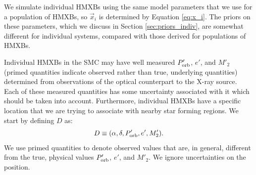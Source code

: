 \documentclass[usenatbib]{mnras}
\newcommand{\given}{\,|\,}
\begin{document}





We simulate individual HMXBs using the same model parameters that we use for a population of HMXBs, so $\vec{x}_i$ is determined by Equation \ref{eq:x_i}. The priors on these parameters, which we discuss in Section \ref{sec:priors_indiv}, are somewhat different for individual systems, compared with those derived for populations of HMXBs.

Individual HMXBs in the SMC may have well measured $P'_{\rm orb}$, $e'$, and $M'_2$ (primed quantities indicate observed rather than true, underlying quantities) determined from observations of the optical counterpart to the X-ray source. Each of these measured quantities has some uncertainty associated with it which should be taken into account. Furthermore, individual HMXBs have a specific location that we are trying to associate with nearby star forming regions. We start by defining $D$ as:
\begin{equation}
D \equiv (\alpha, \delta, P'_{\rm orb}, e', M'_2). \label{eq:D}
\end{equation}
We use primed quantities to denote observed values that are, in general, different from the true, physical values $P'_{\rm orb}$, $e'$, and $M'_2$. We ignore uncertainties on the position.
\end{document}
